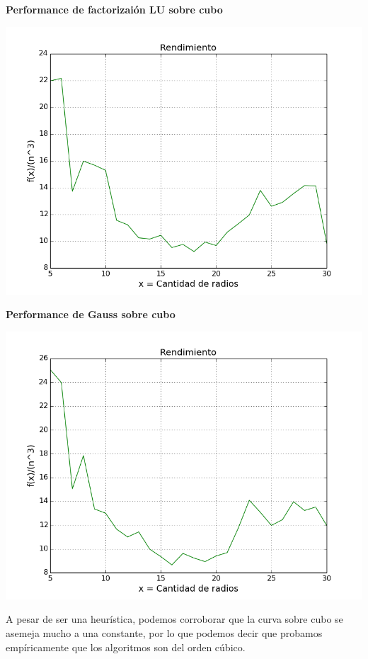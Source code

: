  \textbf{Performance de factorizai\'on LU sobre cubo}\\


\begin{center}
\includegraphics[scale=0.65]{experimentos2a_2b/LuCubo.png}
\end{center}

 \textbf{Performance de Gauss sobre cubo}\\


\begin{center}
\includegraphics[scale=0.65]{experimentos2a_2b/GaussCubo.png}
\end{center}

A pesar de ser una heur\'istica, podemos corroborar que la curva sobre cubo se asemeja mucho a una constante, por lo que podemos decir que probamos emp\'iricamente que los algoritmos son del orden c\'ubico.

